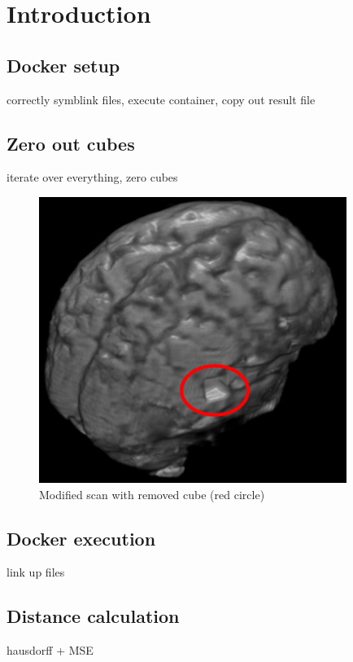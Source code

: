 \section{Introduction}

\subsection{Docker setup}
correctly symblink files, execute container, copy out result file

\subsection{Zero out cubes}
iterate over everything, zero cubes

\begin{figure}[H]
\centering
\includegraphics[width=10cm]{chapters/07_brats3d/images/brain-hdm-marked.png}
\caption{Modified scan with removed cube (red circle)}
\end{figure}


\subsection{Docker execution}
link up files

\subsection{Distance calculation}
hausdorff + MSE

